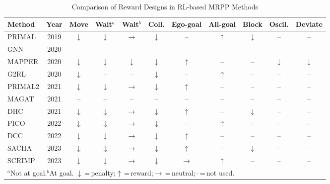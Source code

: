 \documentclass[conference]{IEEEtran}
\begin{document}
\begin{table}[t]
\centering
\caption{Comparison of Reward Designs in RL-based MRPP Methods}
\label{tab:reward_survey}
\renewcommand{\arraystretch}{1.1}
\setlength{\tabcolsep}{4pt}
\footnotesize
\begin{tabular}{lc cccc cc ccc}
\toprule
\textbf{Method} & \textbf{Year}
& \textbf{Move} & \textbf{Wait$^{a}$} & \textbf{Wait$^{b}$}
& \textbf{Coll.} & \textbf{Ego-goal} & \textbf{All-goal}
& \textbf{Block} & \textbf{Oscil.} & \textbf{Deviate} \\
\midrule
PRIMAL   & 2019 & $\downarrow$ & $\downarrow$ & $\rightarrow$ & $\downarrow$ & --             & $\uparrow$   & $\downarrow$ & --           & -- \\
GNN      & 2020 & --           & --           & --            & --           & --             & --           & --           & --           & -- \\
MAPPER   & 2020 & $\downarrow$ & $\downarrow$ & $\downarrow$  & $\downarrow$ & $\uparrow$     & --           & --           & $\downarrow$ & $\downarrow$ \\
G2RL     & 2020 & $\downarrow$ & --           & --            & $\downarrow$ & --             & $\uparrow$   & --           & --           & -- \\
PRIMAL2  & 2021 & $\downarrow$ & $\downarrow$ & $\rightarrow$ & $\downarrow$ & $\uparrow$     & --           & --           & --           & -- \\
MAGAT    & 2021 & --           & --           & --            & --           & --             & --           & --           & --           & -- \\
DHC      & 2021 & $\downarrow$ & $\downarrow$ & $\rightarrow$ & $\downarrow$ & $\uparrow$     & --           & $\downarrow$ & --           & -- \\
PICO     & 2022 & $\downarrow$ & $\downarrow$ & $\rightarrow$ & $\downarrow$ & --             & $\uparrow$   & --           & --           & -- \\
DCC      & 2022 & $\downarrow$ & $\downarrow$ & $\rightarrow$ & $\downarrow$ & $\uparrow$     & --           & --           & --           & -- \\
SACHA    & 2023 & $\downarrow$ & $\downarrow$ & $\rightarrow$ & $\downarrow$ & $\uparrow$     & --           & $\downarrow$ & --           & -- \\
SCRIMP   & 2023 & $\downarrow$ & $\downarrow$ & $\rightarrow$ & $\downarrow$ & $\rightarrow$  & $\uparrow$   & --           & --           & -- \\
\bottomrule
\multicolumn{11}{l}{\scriptsize $^{a}$Not at goal.\quad $^{b}$At goal.\quad
$\downarrow$\,=\,penalty;\;$\uparrow$\,=\,reward;\;$\rightarrow$\,=\,neutral;\;--\,=\,not used.}
\end{tabular}
\end{table}
\end{document}
